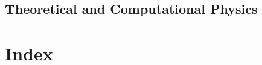 \documentclass[11pt,a4paper,twoside,twocolumn]{article}
\begin{document}
\begin{bibunit}[hplain]

\putbib[combined]
\end{bibunit}


\subsection{Theoretical and Computational Physics}

%
%

\begin{bibunit}[hplain]

\putbib[combined]
\end{bibunit}

\begin{bibunit}[hplain]

\putbib[combined]
\end{bibunit}





%

\onecolumn


\newpage
\section{Index} \printindex

\renewcommand{\bibsection}{\paragraph{\refname}\par}
\setlength{\bibhang}{0pt}

%
%
\end{document}
